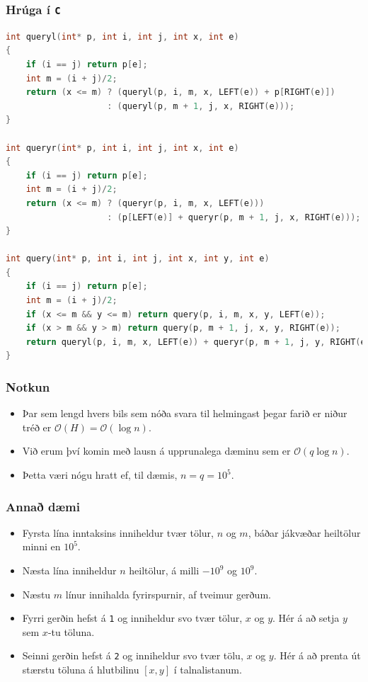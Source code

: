 \documentclass{beamer}
\begin{document}
\begin{frame}[fragile]
	\frametitle{Hrúga í \texttt{C}}
	\tiny
	\begin{lstlisting}[language=C]
int queryl(int* p, int i, int j, int x, int e)
{
	if (i == j) return p[e];
	int m = (i + j)/2;
	return (x <= m) ? (queryl(p, i, m, x, LEFT(e)) + p[RIGHT(e)])
                    : (queryl(p, m + 1, j, x, RIGHT(e)));
}

int queryr(int* p, int i, int j, int x, int e)
{
	if (i == j) return p[e];
	int m = (i + j)/2;
	return (x <= m) ? (queryr(p, i, m, x, LEFT(e)))
                    : (p[LEFT(e)] + queryr(p, m + 1, j, x, RIGHT(e)));
}

int query(int* p, int i, int j, int x, int y, int e)
{
	if (i == j) return p[e];
	int m = (i + j)/2;
	if (x <= m && y <= m) return query(p, i, m, x, y, LEFT(e));
	if (x > m && y > m) return query(p, m + 1, j, x, y, RIGHT(e));
	return queryl(p, i, m, x, LEFT(e)) + queryr(p, m + 1, j, y, RIGHT(e));
}
\end{lstlisting}
\end{frame}

\begin{frame}
\frametitle{Notkun}
\begin{itemize}
\item<1-> Þar sem lengd hvers bils sem nóða svara til helmingast þegar farið er niður tréð er $\mathcal{O}(H) = \mathcal{O}(\log n)$.
\item<2-> Við erum því komin með lausn á upprunalega dæminu sem er $\mathcal{O}(q \log n)$.
\item<3-> Þetta væri nógu hratt ef, til dæmis, $n = q = 10^5$.
\end{itemize}
\end{frame}

\begin{frame}
\frametitle{Annað dæmi}
\begin{itemize}
\item<1-> Fyrsta lína inntaksins inniheldur tvær tölur, $n$ og $m$, báðar jákvæðar heiltölur minni en $10^5$.
\item<2-> Næsta lína inniheldur $n$ heiltölur, á milli $-10^9$ og $10^9$.
\item<3-> Næstu $m$ línur innihalda fyrirspurnir, af tveimur gerðum. 
\item<4-> Fyrri gerðin hefst á \texttt{1} og inniheldur svo tvær tölur, $x$ og $y$. Hér á að setja $y$ sem $x$-tu töluna.
\item<5-> Seinni gerðin hefst á \texttt{2} og inniheldur svo tvær tölu,
$x$ og $y$. Hér á að prenta út stærstu töluna á hlutbilinu $[x, y]$ í talnalistanum.
\end{itemize}
\end{frame}
\end{document}
